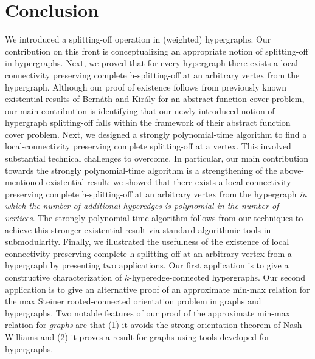 \section{Conclusion}\label{sec:conclusion}
We introduced a splitting-off operation in (weighted) hypergraphs. Our contribution on this front is conceptualizing an appropriate notion of splitting-off in hypergraphs. 
Next, we proved that for every hypergraph there exists a local-connectivity preserving complete h-splitting-off at an arbitrary vertex from the hypergraph.  
Although our proof of existence follows from previously known existential results of Bern\'{a}th and Kir\'{a}ly \cite{Bernath-Kiraly} for an abstract function cover problem, our main contribution is identifying that our newly introduced notion of hypergraph splitting-off falls within the framework of their abstract function cover problem. 
Next, we designed a strongly polynomial-time algorithm to find a local-connectivity preserving complete splitting-off at a vertex. This involved substantial technical challenges to overcome. In particular, our main contribution towards the strongly polynomial-time algorithm is a strengthening of the above-mentioned existential result: we showed that there exists a local connectivity preserving complete h-splitting-off at an arbitrary vertex from the hypergraph 
\emph{in which the number of additional hyperedges is polynomial in the number of vertices}. 
The strongly polynomial-time algorithm follows from our techniques to achieve this stronger existential result via standard algorithmic tools in submodularity. 
Finally, we illustrated the usefulness of the existence of local connectivity preserving complete h-splitting-off at an arbitrary vertex from a hypergraph by presenting two applications. 
Our first application is to give a constructive characterization of $k$-hyperedge-connected hypergraphs. Our second application is to give an alternative proof of an approximate min-max relation for 
the max Steiner rooted-connected orientation problem in graphs and hypergraphs. 
Two notable features of our proof of the approximate min-max relation for \emph{graphs} are that (1) it avoids the strong orientation theorem of Nash-Williams and (2) it proves a result for graphs using tools developed for hypergraphs. %

